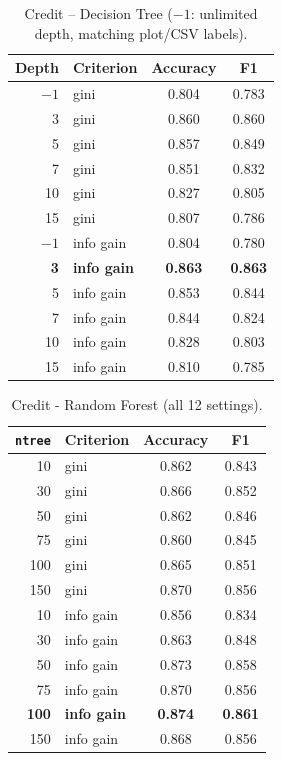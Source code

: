 \documentclass[11pt]{article}
\begin{document}
\begin{table}[htbp]
  \centering
  \footnotesize
  \caption{Credit -- Decision Tree ($-1$: unlimited depth, matching plot/CSV labels).}
  \label{tab:credit-dt}
  \begin{tabular}{r l cc}
    \toprule
    Depth & Criterion & Accuracy & F1 \\
    \midrule
    $-1$ & gini & 0.804 & 0.783 \\
    3 & gini & 0.860 & 0.860 \\
    5 & gini & 0.857 & 0.849 \\
    7 & gini & 0.851 & 0.832 \\
    10 & gini & 0.827 & 0.805 \\
    15 & gini & 0.807 & 0.786 \\
    $-1$ & info gain & 0.804 & 0.780 \\
    \textbf{3} & \textbf{info gain} & \textbf{0.863} & \textbf{0.863} \\
    5 & info gain & 0.853 & 0.844 \\
    7 & info gain & 0.844 & 0.824 \\
    10 & info gain & 0.828 & 0.803 \\
    15 & info gain & 0.810 & 0.785 \\
    \bottomrule
  \end{tabular}
\end{table}

\begin{table}[htbp]
  \centering
  \footnotesize
  \caption{Credit - Random Forest (all 12 settings).}
  \label{tab:credit-rf}
  \begin{tabular}{r l cc}
    \toprule
    \texttt{ntree} & Criterion & Accuracy & F1 \\
    \midrule
    10 & gini & 0.862 & 0.843 \\
    30 & gini & 0.866 & 0.852 \\
    50 & gini & 0.862 & 0.846 \\
    75 & gini & 0.860 & 0.845 \\
    100 & gini & 0.865 & 0.851 \\
    150 & gini & 0.870 & 0.856 \\
    10 & info gain & 0.856 & 0.834 \\
    30 & info gain & 0.863 & 0.848 \\
    50 & info gain & 0.873 & 0.858 \\
    75 & info gain & 0.870 & 0.856 \\
    \textbf{100} & \textbf{info gain} & \textbf{0.874} & \textbf{0.861} \\
    150 & info gain & 0.868 & 0.856 \\
    \bottomrule
  \end{tabular}
\end{table}
\end{document}
